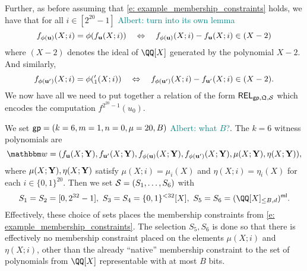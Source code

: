 \documentclass[11pt,letterpaper,usenames,dvipsnames]{article}
\newcommand{\albert}[1]{\textcolor{teal}{Albert: {#1}}}
\begin{document}
Further, as before assuming that \eqref{e: example_membership_constraints} holds, we have that for all $i\in [2^{20}-1]$  \albert{turn into its own lemma}
%
$$
f_{\phi(\mathbf{u})}(X; i) = \phi(f_{\mathbf{u}}(X; i)) \quad \Leftrightarrow\quad f_{\phi(\mathbf{u})}(X;i)-f_{\mathbf{u}}(X;i) \in (X-2) 
$$
where $(X-2)$ denotes the ideal of $\QQ[X]$ generated by the polynomial $X-2$. And similarly,
$$
f_{\phi(\mathbf{u}')}(X; i) = \phi(_1'(X; i)) \quad \Leftrightarrow\quad f_{\phi(\mathbf{u}')}(X;i)-f_{\mathbf{u}'}(X;i) \in (X-2). 
$$
%
% 
We now have all we need to put together a relation of the form $\mathsf{REL}_{\mathsf{gp}, \mathfrak{Q}, \mathcal{S}}$ which encodes the computation $f^{2^{20}-1}(u_0)$.

We set $\mathsf{gp}=(k=6,m=1,n=0,\mu=20, B)$ \albert{what $B$?}. The $k=6$ witness polynomials are $$\wit=(f_{\uu}(X;\YY), f_{\uu'}(X;\YY), f_{\phi(\uu)}(X;\YY),  f_{\phi(\uu')}(X;\YY), \mu(X;\YY), \eta(X;\YY)),$$ where $\mu(X;\mathbf{Y}), \eta(X;\mathbf{Y})$ satisfy $\mu(X;i)=\mu_i(X)$ and $\eta(X;i)=\eta_i(X)$ for each $i\in \{0,1\}^{20}$. Then we set $\mathcal{S}=(S_1, \ldots, S_6)$ with
%
$$S_1 = S_2 = [0,2^{32}-1],\ S_3=S_4= \{0,1\}^{< 32}[X],\ S_5=S_6=\mainQpolyringmultilin.$$
%
Effectively, these choice of sets places the membership constraints from \cref{e: example_membership_constraints}. The selection $S_5, S_6$ is done so that there is effectively no membership constraint placed on the elements  $\mu(X;i)$ and $\eta(X;i)$, other than the already ``native'' membership constraint to the set of polynomials from $\QQ[X]$ representable with at most $B$ bits.
\end{document}
